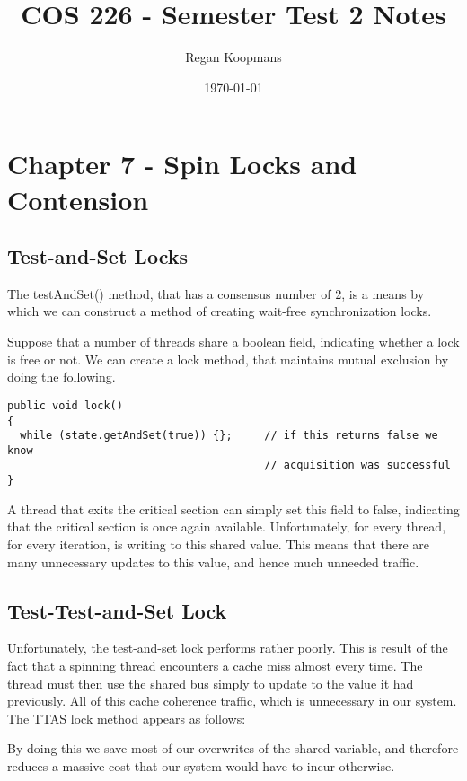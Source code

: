 \documentclass[11pt]{article}
\author{Regan Koopmans}
\date{\today}
\title{COS 226 - Semester Test 2 Notes}
\begin{document}
\maketitle
\tableofcontents


\section{Chapter 7 - Spin Locks and Contension}
\label{sec:orgheadline11}

\subsection{Test-and-Set Locks}
\label{sec:orgheadline1}

The testAndSet() method, that has a consensus number of 2, is a means by which we can construct
a method of creating wait-free synchronization locks.

Suppose that a number of threads share a boolean field, indicating whether a lock is free or not.
We can create a lock method, that maintains mutual exclusion by doing the following.

\begin{verbatim}
public void lock()
{
  while (state.getAndSet(true)) {};     // if this returns false we know
                                        // acquisition was successful
}
\end{verbatim}

A thread that exits the critical section can simply set this field to false, indicating that
the critical section is once again available. Unfortunately, for every thread, for every 
iteration, is writing to this shared value. This means that there are many unnecessary updates
to this value, and hence much unneeded traffic.

\subsection{Test-Test-and-Set Lock}
\label{sec:orgheadline2}

Unfortunately, the test-and-set lock performs rather poorly. This is result of the fact that a
spinning thread encounters a cache miss almost every time. The thread must then use the shared
bus simply to update to the value it had previously. All of this cache coherence traffic, which
is unnecessary in our system. The TTAS lock method appears as follows:

By doing this we save most of our overwrites of the shared variable, and therefore reduces a
massive cost that our system would have to incur otherwise.
\end{document}
